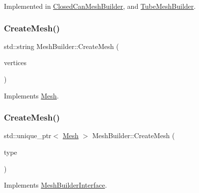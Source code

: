 Implemented in \mbox{\hyperlink{class_closed_can_mesh_builder_a5d9a174577e0957f768300b32fd367cf}{Closed\+Can\+Mesh\+Builder}}, and \mbox{\hyperlink{class_tube_mesh_builder_a16c5008efeefa80378f86b2a8e116af4}{Tube\+Mesh\+Builder}}.

\mbox{\label{class_mesh_builder_a33b55c406864ac41830dce591fb84ab0}} 
\subsubsection{\texorpdfstring{CreateMesh()}{CreateMesh()}\hspace{0.1cm}{\footnotesize\ttfamily [1/2]}}
{\footnotesize\ttfamily std\+::string Mesh\+Builder\+::\+Create\+Mesh (\begin{DoxyParamCaption}\item[{int}]{vertices }\end{DoxyParamCaption})\hspace{0.3cm}{\ttfamily [virtual]}}



Implements \mbox{\hyperlink{class_mesh_ae1d22f25fdcadd6dc58793462ffa65a6}{Mesh}}.

\mbox{\label{class_mesh_builder_a51d89fe601df06e63112c70416ac03dc}} 
\subsubsection{\texorpdfstring{CreateMesh()}{CreateMesh()}\hspace{0.1cm}{\footnotesize\ttfamily [2/2]}}
{\footnotesize\ttfamily std\+::unique\+\_\+ptr$<$ \mbox{\hyperlink{class_mesh}{Mesh}} $>$ Mesh\+Builder\+::\+Create\+Mesh (\begin{DoxyParamCaption}\item[{\mbox{\hyperlink{_abstract_factory_2_abstract_factory_2builder_2_mesh_builder_8h_ad6436347ddb93aed826a19081b53dd61}{M\+E\+S\+H\+T\+Y\+PE}}}]{type }\end{DoxyParamCaption})\hspace{0.3cm}{\ttfamily [virtual]}}



Implements \mbox{\hyperlink{class_mesh_builder_interface_a2d9b31466ef198b2029438970af81323}{Mesh\+Builder\+Interface}}.

